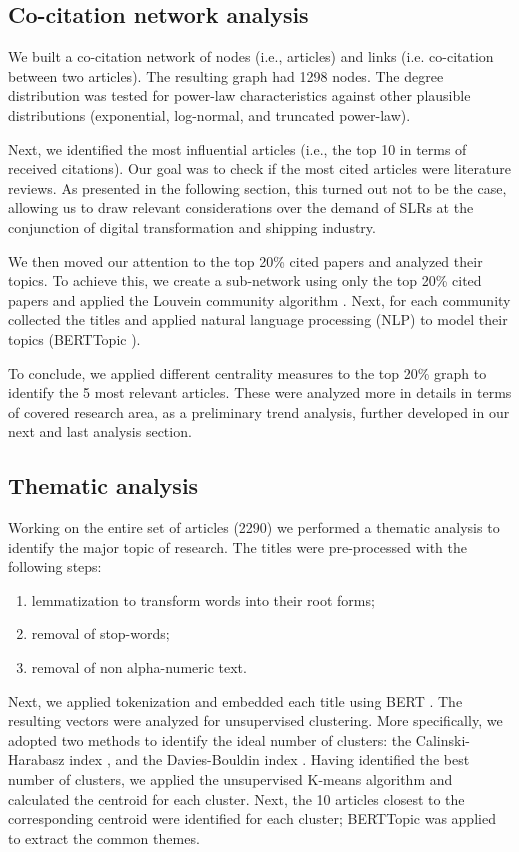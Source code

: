 \documentclass[jmse,review,submit,pdftex,moreauthors]{Definitions/mdpi}
\begin{document}
\subsection{Co-citation network analysis}
We built a co-citation network of nodes (i.e., articles) and links (i.e. co-citation between two articles). The resulting graph had 1298 nodes. The degree distribution was tested for power-law characteristics against other plausible distributions (exponential, log-normal, and truncated power-law).

Next, we identified the most influential articles (i.e., the top 10 in terms of received citations). Our goal was to check if the most cited articles were literature reviews. As presented in the following section, this turned out not to be the case, allowing us to draw relevant considerations over the demand of SLRs at the conjunction of digital transformation and shipping industry.

We then moved our attention to the top 20\% cited papers and analyzed their topics. To achieve this, we create a sub-network using only the top 20\% cited papers and applied the Louvein community algorithm \citep{blondel2008fast}. Next, for each community collected the titles and applied natural language processing (NLP) to model their topics (BERTTopic \citep{paulcombining}).

To conclude, we applied different centrality measures to the top 20\% graph to identify the 5 most relevant articles. These were analyzed more in details in terms of covered research area, as a preliminary trend analysis, further developed in our next and last analysis section.

\subsection{Thematic analysis}
Working on the entire set of articles (2290) we performed a thematic analysis to identify the major topic of research. The titles were pre-processed with the following steps:
\begin{enumerate}
	\item lemmatization to transform words into their root forms;
	\item removal of stop-words;
	\item removal of non alpha-numeric text.
\end{enumerate}
Next, we applied tokenization and embedded each title using BERT \citep{devlin2018bert}. The resulting vectors were analyzed for unsupervised clustering. More specifically, we adopted two methods to identify the ideal number of clusters: the Calinski-Harabasz index \citep{calinski1974dendrite}, and the Davies-Bouldin index \citep{davies1979cluster}.
Having identified the best number of clusters, we applied the unsupervised K-means algorithm and calculated the centroid for each cluster.
Next, the 10 articles closest to the corresponding centroid were identified for each cluster; BERTTopic was applied to extract the common themes.
\end{document}
